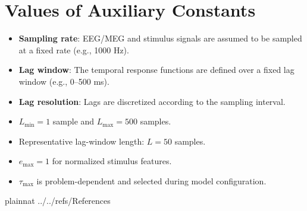 \documentclass[12pt]{article}
\begin{document}
\section{Values of Auxiliary Constants}\label{SecAuxConstants}

\begin{itemize}
  \item \textbf{Sampling rate}: EEG/MEG and stimulus signals are assumed to be sampled at a fixed rate (e.g., 1000 Hz).
  \item \textbf{Lag window}: The temporal response functions are defined over a fixed lag window (e.g., 0--500 ms).
  \item \textbf{Lag resolution}: Lags are discretized according to the sampling interval.
  \item $L_{\text{min}} = 1$ sample and $L_{\text{max}} = 500$ samples.
  \item Representative lag-window length: $L = 50$ samples.
  \item $e_{\text{max}} = 1$ for normalized stimulus features.
  \item $\tau_{\text{max}}$ is problem-dependent and selected during model configuration.
\end{itemize}




\newpage

 {plainnat}
 {../../refs/References}

\end{document}
